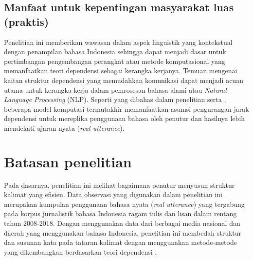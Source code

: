 \subsection{Manfaat untuk kepentingan masyarakat luas (praktis)}
Penelitian ini memberikan wawasan dalam aspek linguistik yang kontekstual dengan penampilan bahasa Indonesia sehingga dapat menjadi dasar untuk pertimbangan pengembangan perangkat atau metode komputasional yang memanfaatkan teori dependensi sebagai kerangka kerjanya. Temuan mengenai kaitan struktur dependensi yang memudahkan komunikasi dapat menjadi acuan utama untuk kerangka kerja dalam pemrosesan bahasa alami atau \textit{Natural Language Processing} (NLP). Seperti yang dibahas dalam penelitian \cite{klein2004corpus} serta \cite{smith2006minimum}, beberapa model komputasi termutakhir memanfaatkan asumsi pengurangan jarak dependensi untuk mereplika penggunaan bahasa oleh penutur dan hasilnya lebih mendekati ujaran nyata (\textit{real utterance}).

\section{Batasan penelitian}
Pada dasarnya, penelitian ini melihat bagaimana penutur menyusun struktur kalimat yang efisien. Data observasi yang digunakan dalam penelitian ini merupakan kumpulan penggunaan bahasa nyata (\textit{real utterance}) yang tergabung pada korpus jurnalistik bahasa Indonesia ragam tulis dan lisan dalam rentang tahun 2008-2018. Dengan menggunakan data dari berbagai media nasional dan daerah yang menggunakan bahasa Indonesia, penelitian ini membedah struktur dan susunan kata pada tataran kalimat dengan menggunakan metode-metode yang dikembangkan berdasarkan teori dependensi \citep{tesniere1959elements}. 

